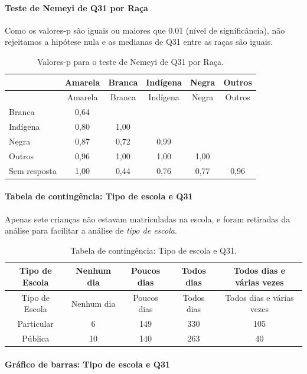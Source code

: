 \documentclass[]{article}
\let\oldparagraph\paragraph
\renewcommand{\paragraph}[1]{\oldparagraph{#1}\mbox{}}
\begin{document}
\hypertarget{teste-de-nemeyi-de-q31-por-rauxe7a}{%
\paragraph{Teste de Nemeyi de Q31 por Raça}\label{teste-de-nemeyi-de-q31-por-rauxe7a}}

Como os valores-p são iguais ou maiores que 0.01 (nível de significância), não rejeitamos a hipótese nula e as medianas de Q31 entre as raças são iguais.

\begin{longtable}[]{@{}lccccc@{}}
\caption{\label{tab:unnamed-chunk-1055}Valores-p para o teste de Nemeyi de Q31 por Raça.}\tabularnewline
\toprule
& Amarela & Branca & Indígena & Negra & Outros\tabularnewline
\midrule
\endfirsthead
\toprule
& Amarela & Branca & Indígena & Negra & Outros\tabularnewline
\midrule
\endhead
Branca & 0,64 & & & &\tabularnewline
Indígena & 0,80 & 1,00 & & &\tabularnewline
Negra & 0,87 & 0,72 & 0,99 & &\tabularnewline
Outros & 0,96 & 1,00 & 1,00 & 1,00 &\tabularnewline
Sem resposta & 1,00 & 0,44 & 0,76 & 0,77 & 0,96\tabularnewline
\bottomrule
\end{longtable}

\cleardoublepage

\hypertarget{tabela-de-continguxeancia-tipo-de-escola-e-q31}{%
\paragraph{Tabela de contingência: Tipo de escola e Q31}\label{tabela-de-continguxeancia-tipo-de-escola-e-q31}}

Apenas sete crianças não estavam matriculadas na escola, e foram retiradas da análise para facilitar a análise de \emph{tipo de escola}.

\begin{longtable}[]{@{}ccccc@{}}
\caption{\label{tab:unnamed-chunk-1056}Tabela de contingência: Tipo de escola e Q31.}\tabularnewline
\toprule
Tipo de Escola & Nenhum dia & Poucos dias & Todos dias & Todos dias e várias vezes\tabularnewline
\midrule
\endfirsthead
\toprule
Tipo de Escola & Nenhum dia & Poucos dias & Todos dias & Todos dias e várias vezes\tabularnewline
\midrule
\endhead
Particular & 6 & 149 & 330 & 105\tabularnewline
Pública & 10 & 140 & 263 & 40\tabularnewline
\bottomrule
\end{longtable}

\hypertarget{gruxe1fico-de-barras-tipo-de-escola-e-q31}{%
\paragraph{Gráfico de barras: Tipo de escola e Q31}\label{gruxe1fico-de-barras-tipo-de-escola-e-q31}}
\end{document}
